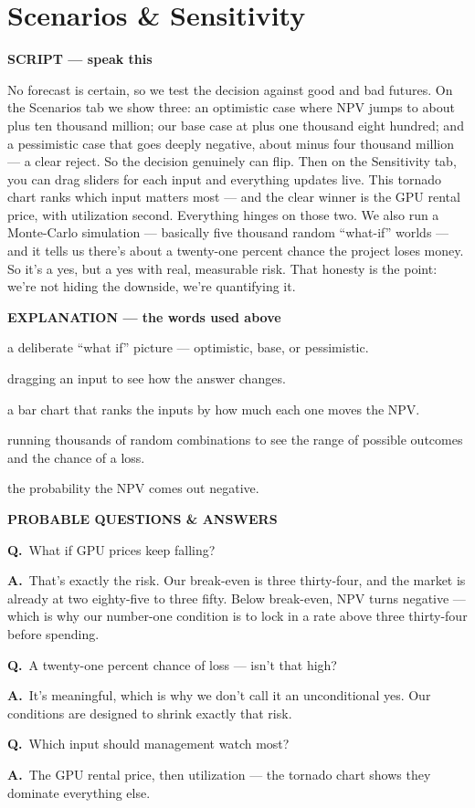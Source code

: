 \documentclass[12pt,a4paper]{article}
\newcommand{\block}[2]{\par\medskip\noindent\textcolor{#1}{\textbf{#2}}\par\nobreak\smallskip}
\newcommand{\SC}{\block{tvblue}{SCRIPT --- speak this}}
\newcommand{\EX}{\block{tvgreen}{EXPLANATION --- the words used above}}
\newcommand{\PQ}{\block{tvamber}{PROBABLE QUESTIONS \& ANSWERS}}
\newcommand{\qa}[2]{\par\noindent\textbf{Q.}~#1\par\noindent\textbf{A.}~#2\par\smallskip}
\newenvironment{terms}{\begin{description}[leftmargin=0pt,itemsep=2pt,font=\normalfont\bfseries]}{\end{description}}
\begin{document}
\section{Scenarios \& Sensitivity}

\SC
No forecast is certain, so we test the decision against good and bad futures. On the Scenarios tab we
show three: an optimistic case where NPV jumps to about plus ten thousand million; our base case at
plus one thousand eight hundred; and a pessimistic case that goes deeply negative, about minus four
thousand million --- a clear reject. So the decision genuinely can flip. Then on the Sensitivity tab,
you can drag sliders for each input and everything updates live. This tornado chart ranks which input
matters most --- and the clear winner is the GPU rental price, with utilization second. Everything
hinges on those two. We also run a Monte-Carlo simulation --- basically five thousand random ``what-if''
worlds --- and it tells us there's about a twenty-one percent chance the project loses money. So it's a
yes, but a yes with real, measurable risk. That honesty is the point: we're not hiding the downside,
we're quantifying it.

\EX
\begin{terms}
  \item[Scenario:] a deliberate ``what if'' picture --- optimistic, base, or pessimistic.
  \item[Sensitivity / sliders:] dragging an input to see how the answer changes.
  \item[Tornado chart:] a bar chart that ranks the inputs by how much each one moves the NPV.
  \item[Monte-Carlo simulation:] running thousands of random combinations to see the range of possible
  outcomes and the chance of a loss.
  \item[P(loss) \textasciitilde 21\%:] the probability the NPV comes out negative.
\end{terms}

\PQ
\qa{What if GPU prices keep falling?}{That's exactly the risk. Our break-even is three thirty-four, and
the market is already at two eighty-five to three fifty. Below break-even, NPV turns negative --- which
is why our number-one condition is to lock in a rate above three thirty-four before spending.}
\qa{A twenty-one percent chance of loss --- isn't that high?}{It's meaningful, which is why we don't
call it an unconditional yes. Our conditions are designed to shrink exactly that risk.}
\qa{Which input should management watch most?}{The GPU rental price, then utilization --- the tornado
chart shows they dominate everything else.}
\end{document}
